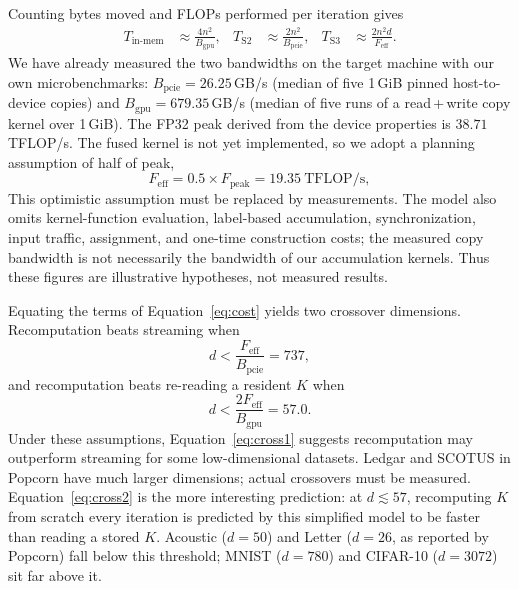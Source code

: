 \documentclass[sigconf]{acmart}
\begin{document}
Counting bytes moved and FLOPs performed per iteration gives
\begin{align}
  T_{\text{in-mem}} &\approx \frac{4n^2}{B_{\mathrm{gpu}}}, &
  T_{\mathrm{S2}}   &\approx \frac{2n^2}{B_{\mathrm{pcie}}}, &
  T_{\mathrm{S3}}   &\approx \frac{2n^2 d}{F_{\mathrm{eff}}}.
  \label{eq:cost}
\end{align}
We have already measured the two bandwidths on the target machine with our own
microbenchmarks: $B_{\mathrm{pcie}} = 26.25$\,GB/s (median of five 1\,GiB
pinned host-to-device copies) and $B_{\mathrm{gpu}} = 679.35$\,GB/s (median of
five runs of a read\,+\,write copy kernel over 1\,GiB). The FP32 peak derived
from the device properties is $38.71$\,TFLOP/s. The fused kernel is not yet
implemented, so we adopt a planning assumption of half of peak,
\begin{equation}
  F_{\mathrm{eff}} = 0.5 \times F_{\text{peak}} = 19.35\ \mathrm{TFLOP/s},
  \label{eq:feff}
\end{equation}
This optimistic assumption must be replaced by measurements. The model also
omits kernel-function evaluation, label-based accumulation, synchronization,
input traffic, assignment, and one-time construction costs; the measured copy
bandwidth is not necessarily the bandwidth of our accumulation kernels. Thus
these figures are illustrative hypotheses, not measured results.

Equating the terms of Equation~\eqref{eq:cost} yields two crossover dimensions.
Recomputation beats streaming when
\begin{equation}
  d < \frac{F_{\mathrm{eff}}}{B_{\mathrm{pcie}}} = 737,
  \label{eq:cross1}
\end{equation}
and recomputation beats re-reading a resident $K$ when
\begin{equation}
  d < \frac{2 F_{\mathrm{eff}}}{B_{\mathrm{gpu}}} = 57.0 .
  \label{eq:cross2}
\end{equation}
Under these assumptions, Equation~\eqref{eq:cross1} suggests recomputation may
outperform streaming for some low-dimensional datasets. Ledgar and SCOTUS in
Popcorn have much larger dimensions; actual crossovers must be measured.
Equation~\eqref{eq:cross2} is the more interesting prediction: at
$d \lesssim 57$, recomputing $K$ from scratch every iteration is predicted by
this simplified model to be faster than reading a stored $K$. Acoustic
($d = 50$) and Letter ($d = 26$, as reported by Popcorn) fall below this
threshold; MNIST ($d = 780$) and CIFAR-10 ($d = 3072$) sit far above it.
\end{document}
